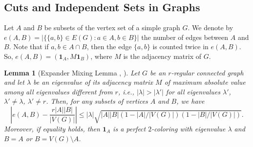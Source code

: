 \documentclass[11pt]{article}
\newtheorem{lemma}{Lemma}[section]
\theoremstyle{definition}
\begin{document}
\subsection{Cuts and Independent Sets in Graphs}\label{3.1}

Let $A$ and $B$ be subsets of the  vertex set of a simple graph $G$. We denote by
$e(A,B)=|\{\{a,b\}\in E(G) : a\in A, b\in B\}|$  the number
of edges between $A$ and
$B$.  Note that if $a,b\in A\cap B$, then the edge $\{a,b\}$ is counted
twice in $e(A,B)$. So, $e(A,B)=(\mathbf{1}_{A}, M\mathbf{1}_{B})$, where $M$
is the adjacency matrix of $G$.

\begin{lemma}[Expander Mixing Lemma \cite{AlonCh}, \cite{Dev}]\label{EMLclaim}
Let $G$ be an $r$-regular connected graph and let $\lambda$ be an eigenvalue of its adjacency matrix $M$ of maximum absolute value among all eigenvalues different from $r$, i.e., $|\lambda|>|\lambda'|$ for all eigenvalues
$\lambda'$, $\lambda'\neq \lambda$, $\lambda'\neq r$.
Then, for any subsets of vertices $A$ and $B$,  we have
$$|e(A,B)-\frac{r|A||B|}{|V(G)|}|\leq
|\lambda|\sqrt{|A||B|(1-|A|/|V(G)|)(1-|B|/|V(G)|)}.$$ Moreover,
if equality holds, then $\mathbf{1}_{A}$ is a perfect
$2$-coloring with eigenvalue $\lambda$ and
$B=A$ or $B=V(G)\setminus A$.
\end{lemma}
\end{document}
